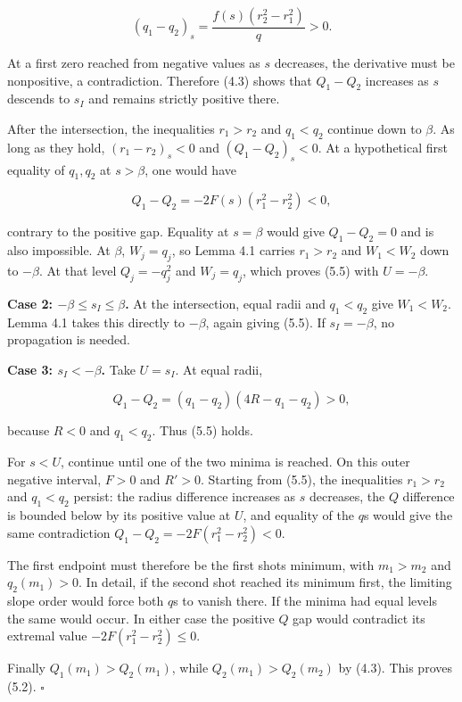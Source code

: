 \documentclass[11pt]{article}
\begin{document}
\[ (q_1-q_2)_s=\frac{f(s)(r_2^2-r_1^2)}q>0.\]

At a first zero reached from negative values as \(s\) decreases, the
derivative must be nonpositive, a contradiction. Therefore (4.3) shows
that \(Q_1-Q_2\) increases as \(s\) descends to \(s_I\) and remains
strictly positive there.

After the intersection, the inequalities \(r_1>r_2\) and \(q_1<q_2\)
continue down to \(\beta\). As long as they hold, \((r_1-r_2)_s<0\) and
\((Q_1-Q_2)_s<0\). At a hypothetical first equality of \(q_1,q_2\) at
\(s>\beta\), one would have

\[Q_1-Q_2=-2F(s)(r_1^2-r_2^2)<0,\]

contrary to the positive gap. Equality at \(s=\beta\) would give
\(Q_1-Q_2=0\) and is also impossible. At \(\beta\), \(W_j=q_j\), so
Lemma 4.1 carries \(r_1>r_2\) and \(W_1<W_2\) down to \(-\beta\). At
that level \(Q_j=-q_j^2\) and \(W_j=q_j\), which proves (5.5) with
\(U=-\beta\).

\textbf{Case 2: \(-\beta\leq s_I\leq\beta\).} At the intersection, equal
radii and \(q_1<q_2\) give \(W_1<W_2\). Lemma 4.1 takes this directly to
\(-\beta\), again giving (5.5). If \(s_I=-\beta\), no propagation is
needed.

\textbf{Case 3: \(s_I<-\beta\).} Take \(U=s_I\). At equal radii,

\[Q_1-Q_2=(q_1-q_2)(4R-q_1-q_2)>0,\]

because \(R<0\) and \(q_1<q_2\). Thus (5.5) holds.

For \(s<U\), continue until one of the two minima is reached. On this
outer negative interval, \(F>0\) and \(R'>0\). Starting from (5.5), the
inequalities \(r_1>r_2\) and \(q_1<q_2\) persist: the radius difference
increases as \(s\) decreases, the \(Q\) difference is bounded below by
its positive value at \(U\), and equality of the \(q\)\textquotesingle s
would give the same contradiction \(Q_1-Q_2=-2F(r_1^2-r_2^2)<0\).

The first endpoint must therefore be the first shot\textquotesingle s
minimum, with \(m_1>m_2\) and \(q_2(m_1)>0\). In detail, if the second
shot reached its minimum first, the limiting slope order would force
both \(q\)\textquotesingle s to vanish there. If the minima had equal
levels the same would occur. In either case the positive \(Q\) gap would
contradict its extremal value \(-2F(r_1^2-r_2^2)\leq0\).

Finally \(Q_1(m_1)>Q_2(m_1)\), while \(Q_2(m_1)>Q_2(m_2)\) by (4.3).
This proves (5.2). \(\square\)
\end{document}
